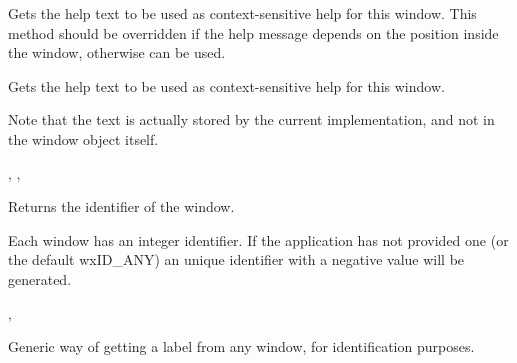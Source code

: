 
Gets the help text to be used as context-sensitive help for this window. This
method should be overridden if the help message depends on the position inside
the window, otherwise  can be used.






\label{wxwindowgethelptext}


Gets the help text to be used as context-sensitive help for this window.

Note that the text is actually stored by the current  implementation,
and not in the window object itself.


, , 


\label{wxwindowgetid}


Returns the identifier of the window.


Each window has an integer identifier. If the application has not provided one
(or the default wxID\_ANY) an unique identifier with a negative value will be generated.


,\rtfsp
{}


\label{wxwindowgetlabel}


Generic way of getting a label from any window, for
identification purposes.


